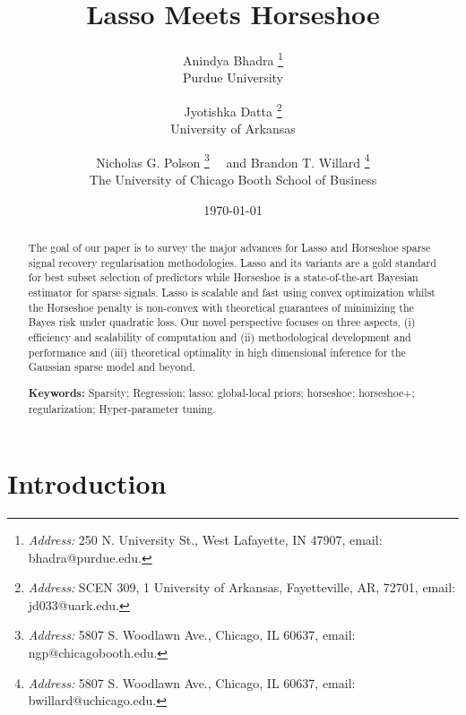 \documentclass[11pt]{article}
\title{Lasso Meets Horseshoe}
\author{Anindya Bhadra  \footnote{{\em Address:} 250 N. University St., West Lafayette, IN 47907, email: bhadra@purdue.edu.} \\Purdue University
\and Jyotishka Datta  \footnote{{\em Address:} SCEN 309, 1 University of Arkansas, Fayetteville, AR, 72701, email: jd033@uark.edu.}\\ University of Arkansas\\
\and Nicholas G. Polson \footnote{{\em Address:} 5807 S. Woodlawn Ave., Chicago, IL 60637, email: ngp@chicagobooth.edu.}  \ \ and Brandon T. Willard \footnote{{\em Address:} 5807 S. Woodlawn Ave., Chicago, IL 60637, email: bwillard@uchicago.edu.} \\The University of Chicago Booth School of
Business}
\date{\today}
\begin{document}
\maketitle
\onehalfspacing


\begin{abstract}
\baselineskip=15pt
\noindent %
The goal of our paper is to survey the major advances for Lasso and Horseshoe sparse signal recovery regularisation methodologies. Lasso and its variants are a gold standard for best subset selection of predictors while Horseshoe is a state-of-the-art Bayesian estimator for sparse signals. Lasso is scalable and fast using convex optimization whilst the Horseshoe penalty is non-convex with theoretical guarantees of minimizing the Bayes risk under quadratic loss.  Our novel perspective focuses on three aspects, (i) efficiency and scalability of computation and (ii) methodological development and performance and (iii) theoretical optimality in high dimensional inference for the Gaussian sparse model and beyond. 


{\bf Keywords:} Sparsity; Regression; lasso; global-local priors; horseshoe; horseshoe+; regularization; Hyper-parameter tuning. 
\end{abstract}

\section{Introduction}


\end{document}
